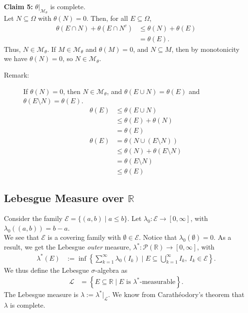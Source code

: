 \documentclass[9pt]{extarticle}
\newcommand{\R}{\mathbb{R}}
\begin{document}
\begin{description}
          \textbf{Claim 5:} $\theta|_{\mathcal{M}_{\theta}}$ is complete.\\

          Let $N\subseteq \Omega$ with $\theta(N) = 0$. Then, for all $E\subseteq \Omega$,
          \begin{align*}
            \theta(E\cap N) + \theta(E\cap N^{c}) &\leq \theta(N) + \theta(E)\\
                                                  &= \theta(E).
          \end{align*}
          Thus, $N\in \mathcal{M}_{\theta}$. If $M\in \mathcal{M}_{\theta}$ and $\theta(M) = 0$, and $N\subseteq M$, then by monotonicity we have $\theta(N) = 0$, so $N\in \mathcal{M}_{\theta}$.
  \end{description}
  \begin{description}
    \item[Remark:] If $\theta(N) = 0$, then $N\in \mathcal{M}_{\theta}$, and $\theta(E\cup N) = \theta(E)$ and $\theta(E\setminus N) = \theta(E)$.
      \begin{align*}
        \theta(E) &\leq \theta(E\cup N)\\
                  &\leq \theta(E) + \theta(N)\\
                  &= \theta(E)\\
        \theta(E) &= \theta(N \cup (E\setminus N))\\
                  &\leq \theta(N) + \theta(E\setminus N)\\
                  &= \theta(E\setminus N)\\
                  & \leq \theta(E)
      \end{align*}
  \end{description}
  \subsection{Lebesgue Measure over $\R$}%
  Consider the family $\mathcal{E} = \{(a,b) \mid a\leq b\}$. Let $\lambda_0: \mathcal{E}\rightarrow [0,\infty]$, with $\lambda_0((a,b)) = b-a$.\\

  We see that $\mathcal{E}$ is a covering family with $\emptyset \in \mathcal{E}$. Notice that $\lambda_0(\emptyset) = 0$. As a result, we get the Lebesgue \textit{outer} measure, $\lambda^{\ast}: \mathcal{P}(\R)\rightarrow [0,\infty]$, with
  \begin{align*}
    \lambda^{\ast}(E) &:= \inf\left\{\sum_{k=1}^{\infty}\lambda_0(I_k)\mid E\subseteq \bigcup_{k=1}^{\infty}I_k,~I_k\in\mathcal{E}\right\}.
  \end{align*}
  We thus define the Lebesgue $\sigma$-algebra as
  \begin{align*}
    \mathcal{L} &= \left\{E\subseteq \R\mid E\text{ is $\lambda^{\ast}$-measurable}\right\}.
  \end{align*}
  The Lebesgue measure is $\lambda := \lambda^{\ast}|_{\mathcal{L}}$. We know from Carathéodory's theorem that $\lambda$ is complete.
\end{document}
